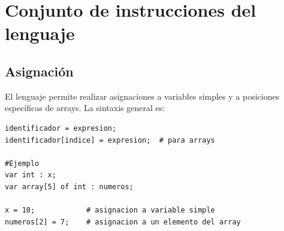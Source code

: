 \documentclass[12pt,a4paper]{article}
\begin{document}









\section{Conjunto de instrucciones del lenguaje}

\subsection{Asignación}

El lenguaje permite realizar asignaciones a variables simples y a posiciones específicas de arrays.  
La sintaxis general es:

\begin{lstlisting}
identificador = expresion;
identificador[indice] = expresion;  # para arrays

#Ejemplo
var int : x;
var array[5] of int : numeros;

x = 10;            # asignacion a variable simple
numeros[2] = 7;    # asignacion a un elemento del array
\end{lstlisting}
\end{document}
